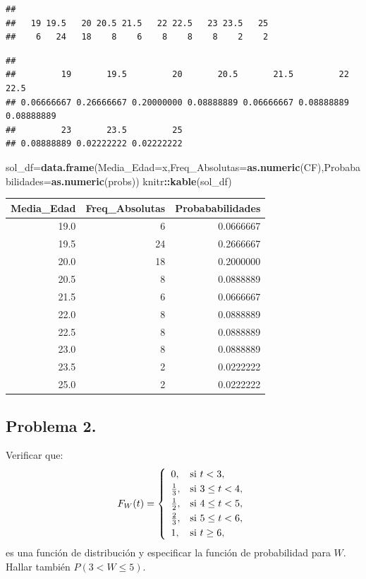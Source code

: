 \documentclass[
]{article}
\newenvironment{Shaded}{\begin{snugshade}}{\end{snugshade}}
\newcommand{\DataTypeTok}[1]{\textcolor[rgb]{0.13,0.29,0.53}{#1}}
\newcommand{\KeywordTok}[1]{\textcolor[rgb]{0.13,0.29,0.53}{\textbf{#1}}}
\newcommand{\NormalTok}[1]{#1}
\newcommand{\OperatorTok}[1]{\textcolor[rgb]{0.81,0.36,0.00}{\textbf{#1}}}
\begin{document}
\begin{verbatim}
## 
##   19 19.5   20 20.5 21.5   22 22.5   23 23.5   25 
##    6   24   18    8    6    8    8    8    2    2
\end{verbatim}

\begin{Shaded}
\end{Shaded}

\begin{verbatim}
## 
##         19       19.5         20       20.5       21.5         22       22.5 
## 0.06666667 0.26666667 0.20000000 0.08888889 0.06666667 0.08888889 0.08888889 
##         23       23.5         25 
## 0.08888889 0.02222222 0.02222222
\end{verbatim}

\begin{Shaded}
\begin{Highlighting}[]
\NormalTok{sol\_df=}\KeywordTok{data.frame}\NormalTok{(}\DataTypeTok{Media\_Edad=}\NormalTok{x,}\DataTypeTok{Freq\_Absolutas=}\KeywordTok{as.numeric}\NormalTok{(CF),}\DataTypeTok{Probababilidades=}\KeywordTok{as.numeric}\NormalTok{(probs))}
\NormalTok{knitr}\OperatorTok{::}\KeywordTok{kable}\NormalTok{(sol\_df)}
\end{Highlighting}
\end{Shaded}

\begin{longtable}[]{@{}rrr@{}}
\toprule
Media\_Edad & Freq\_Absolutas & Probababilidades\tabularnewline
\midrule
\endhead
19.0 & 6 & 0.0666667\tabularnewline
19.5 & 24 & 0.2666667\tabularnewline
20.0 & 18 & 0.2000000\tabularnewline
20.5 & 8 & 0.0888889\tabularnewline
21.5 & 6 & 0.0666667\tabularnewline
22.0 & 8 & 0.0888889\tabularnewline
22.5 & 8 & 0.0888889\tabularnewline
23.0 & 8 & 0.0888889\tabularnewline
23.5 & 2 & 0.0222222\tabularnewline
25.0 & 2 & 0.0222222\tabularnewline
\bottomrule
\end{longtable}

\hypertarget{problema-2.}{%
\subsection{Problema 2.}\label{problema-2.}}

Verificar que: \[F_W (t)=
\left\{\begin{array}{ll}
0, & \mbox{si $t<3$},
 \\[0.1cm]
{1\over 3}, & \mbox{si $3\leq t<4$},
 \\[0.1cm]
{1\over 2}, & \mbox{si $4\leq t<5$},
 \\[0.1cm] 
{2\over 3}, & \mbox{si $5\leq t<6$},
 \\[0.1cm] 
1, & \mbox{si $t\geq 6$},
\end{array}\right.
\] es una función de distribución y especificar la función de
probabilidad para \(W\). Hallar también \(P(3<W\leq 5)\).
\end{document}
